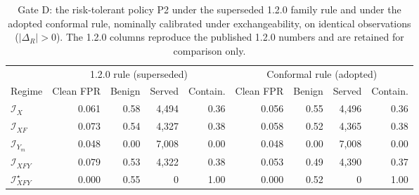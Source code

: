 \begin{table}[!tbp]
\caption{Gate D: the risk-tolerant policy P2 under the superseded 1.2.0 family rule and under the adopted conformal rule, nominally calibrated under exchangeability, on identical observations ($|\Delta_R|>0$). The 1.2.0 columns reproduce the published 1.2.0 numbers and are retained for comparison only.}
\label{tab:s-policy-rule-comparison}
\centering
\scriptsize
\setlength{\tabcolsep}{4pt}
\begin{tabular}{@{}lrrrrrrrr@{}}
\toprule
 & \multicolumn{4}{c}{1.2.0 rule (superseded)} & \multicolumn{4}{c}{Conformal rule (adopted)} \\
\cmidrule(lr){2-5}\cmidrule(lr){6-9}
Regime & Clean FPR & Benign & Served & Contain. & Clean FPR & Benign & Served & Contain. \\
\midrule
$\mathcal I_X$ & 0.061 & 0.58 & 4,494 & 0.36 & 0.056 & 0.55 & 4,496 & 0.36 \\
$\mathcal I_{XF}$ & 0.073 & 0.54 & 4,327 & 0.38 & 0.058 & 0.52 & 4,365 & 0.38 \\
$\mathcal I_{Y_m}$ & 0.048 & 0.00 & 7,008 & 0.00 & 0.048 & 0.00 & 7,008 & 0.00 \\
$\mathcal I_{XFY}$ & 0.079 & 0.53 & 4,322 & 0.38 & 0.053 & 0.49 & 4,390 & 0.37 \\
$\mathcal I_{XFY}^{\star}$ & 0.000 & 0.55 & 0 & 1.00 & 0.000 & 0.52 & 0 & 1.00 \\
\bottomrule
\end{tabular}
\end{table}

